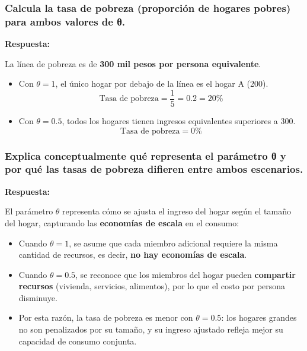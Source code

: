 \documentclass[
]{article}
\begin{document}
\subsubsection{Calcula la tasa de pobreza (proporción de hogares pobres)
para ambos valores de
θ.}\label{calcula-la-tasa-de-pobreza-proporciuxf3n-de-hogares-pobres-para-ambos-valores-de-ux3b8.}

\textbf{Respuesta:}

La línea de pobreza es de \textbf{300 mil pesos por persona
equivalente}.

\begin{itemize}
\item
  Con \(\theta = 1\), el único hogar por debajo de la línea es el hogar
  A (200).\\
  \[
  \text{Tasa de pobreza} = \frac{1}{5} = 0.2 = 20\%
  \]
\item
  Con \(\theta = 0.5\), todos los hogares tienen ingresos equivalentes
  superiores a 300.\\
  \[
  \text{Tasa de pobreza} = 0\%
  \]
\end{itemize}

\subsubsection{Explica conceptualmente qué representa el parámetro θ y
por qué las tasas de pobreza difieren entre ambos
escenarios.}\label{explica-conceptualmente-quuxe9-representa-el-paruxe1metro-ux3b8-y-por-quuxe9-las-tasas-de-pobreza-difieren-entre-ambos-escenarios.}

\textbf{Respuesta:}

El parámetro \(\theta\) representa cómo se ajusta el ingreso del hogar
según el tamaño del hogar, capturando las \textbf{economías de escala}
en el consumo:

\begin{itemize}
\item
  Cuando \(\theta = 1\), se asume que cada miembro adicional requiere la
  misma cantidad de recursos, es decir, \textbf{no hay economías de
  escala}.
\item
  Cuando \(\theta = 0.5\), se reconoce que los miembros del hogar pueden
  \textbf{compartir recursos} (vivienda, servicios, alimentos), por lo
  que el costo por persona disminuye.
\item
  Por esta razón, la tasa de pobreza es menor con \(\theta = 0.5\): los
  hogares grandes no son penalizados por su tamaño, y su ingreso
  ajustado refleja mejor su capacidad de consumo conjunta.
\end{itemize}
\end{document}
